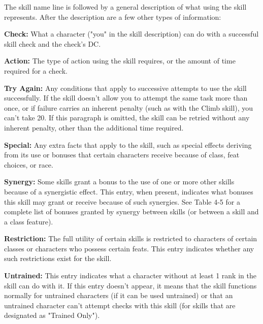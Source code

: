 \vspace{12pt}
The skill name line is followed by a general description of what using the skill 
represents. After the description are a few other types of information:

\textbf{Check:} What a character ("you" in the skill description) can do with 
a successful skill check and the check's DC.

\textbf{Action:} The type of action using the skill requires, or the amount of 
time required for a check.

\textbf{Try Again:} Any conditions that apply to successive attempts to use the 
skill successfully. If the skill doesn't allow you to attempt the same task more 
than once, or if failure carries an inherent penalty (such as with the Climb skill), 
you can't take 20. If this paragraph is omitted, the skill can be retried without 
any inherent penalty, other than the additional time required.

\textbf{Special:} Any extra facts that apply to the skill, such as special effects 
deriving from its use or bonuses that certain characters receive because of class, 
feat choices, or race.

\textbf{Synergy:} Some skills grant a bonus to the use of one or more other skills 
because of a synergistic effect. This entry, when present, indicates what bonuses 
this skill may grant or receive because of such synergies. See Table 4-5 for a 
complete list of bonuses granted by synergy between skills (or between a skill 
and a class feature).

\textbf{Restriction:} The full utility of certain skills is restricted to characters 
of certain classes or characters who possess certain feats. This entry indicates 
whether any such restrictions exist for the skill.

\textbf{Untrained:} This entry indicates what a character without at least 1 rank 
in the skill can do with it. If this entry doesn't appear, it means that the skill 
functions normally for untrained characters (if it can be used untrained) or that 
an untrained character can't attempt checks with this skill (for skills that are 
designated as "Trained Only").





































